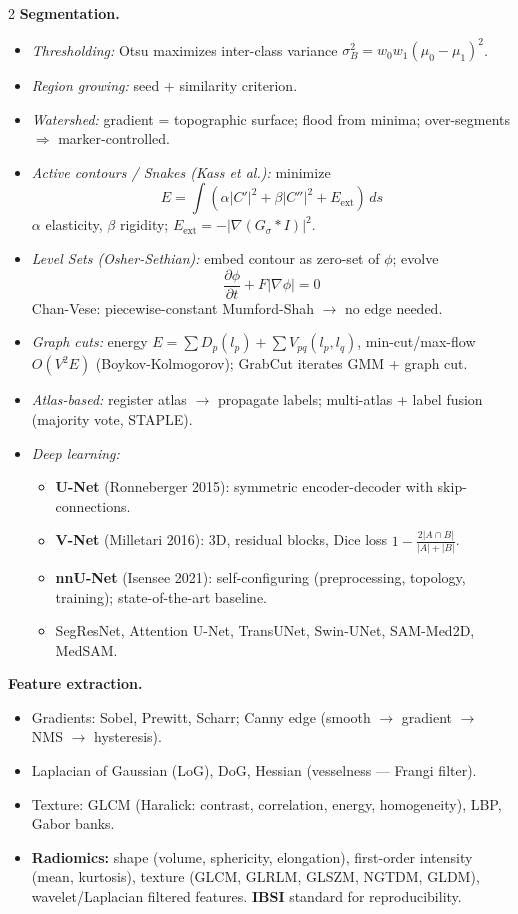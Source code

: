\begin{paracol}{2}
\textbf{Segmentation.}
\begin{itemize}[leftmargin=*,nosep]
  \item \emph{Thresholding:} Otsu maximizes inter-class variance $\sigma_B^2=w_0w_1(\mu_0-\mu_1)^2$.
  \item \emph{Region growing:} seed + similarity criterion.
  \item \emph{Watershed:} gradient = topographic surface; flood from minima; over-segments $\Rightarrow$ marker-controlled.
  \item \emph{Active contours / Snakes (Kass et al.):} minimize
  $$E=\int(\alpha|C'|^2+\beta|C''|^2+E_{\text{ext}})\,ds$$
  $\alpha$ elasticity, $\beta$ rigidity; $E_{\text{ext}}=-|\nabla(G_\sigma * I)|^2$.
  \item \emph{Level Sets (Osher-Sethian):} embed contour as zero-set of $\phi$; evolve
  $$\frac{\partial\phi}{\partial t}+F|\nabla\phi|=0$$
  Chan-Vese: piecewise-constant Mumford-Shah $\to$ no edge needed.
  \item \emph{Graph cuts:} energy $E=\sum D_p(l_p)+\sum V_{pq}(l_p,l_q)$, min-cut/max-flow $O(V^2E)$ (Boykov-Kolmogorov); GrabCut iterates GMM + graph cut.
  \item \emph{Atlas-based:} register atlas $\to$ propagate labels; multi-atlas + label fusion (majority vote, STAPLE).
  \item \emph{Deep learning:}
    \begin{itemize}[leftmargin=*,nosep]
      \item \textbf{U-Net} (Ronneberger 2015): symmetric encoder-decoder with skip-connections.
      \item \textbf{V-Net} (Milletari 2016): 3D, residual blocks, Dice loss $1-\frac{2|A\cap B|}{|A|+|B|}$.
      \item \textbf{nnU-Net} (Isensee 2021): self-configuring (preprocessing, topology, training); state-of-the-art baseline.
      \item SegResNet, Attention U-Net, TransUNet, Swin-UNet, SAM-Med2D, MedSAM.
    \end{itemize}
\end{itemize}

\textbf{Feature extraction.}
\begin{itemize}[leftmargin=*,nosep]
  \item Gradients: Sobel, Prewitt, Scharr; Canny edge (smooth $\to$ gradient $\to$ NMS $\to$ hysteresis).
  \item Laplacian of Gaussian (LoG), DoG, Hessian (vesselness — Frangi filter).
  \item Texture: GLCM (Haralick: contrast, correlation, energy, homogeneity), LBP, Gabor banks.
  \item \textbf{Radiomics:} shape (volume, sphericity, elongation), first-order intensity (mean, kurtosis), texture (GLCM, GLRLM, GLSZM, NGTDM, GLDM), wavelet/Laplacian filtered features. \textbf{IBSI} standard for reproducibility.
\end{itemize}


\end{paracol}
